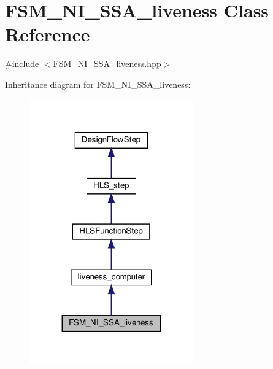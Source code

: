 \hypertarget{classFSM__NI__SSA__liveness}{}\section{F\+S\+M\+\_\+\+N\+I\+\_\+\+S\+S\+A\+\_\+liveness Class Reference}
\label{classFSM__NI__SSA__liveness}


{\ttfamily \#include $<$F\+S\+M\+\_\+\+N\+I\+\_\+\+S\+S\+A\+\_\+liveness.\+hpp$>$}



Inheritance diagram for F\+S\+M\+\_\+\+N\+I\+\_\+\+S\+S\+A\+\_\+liveness\+:
\nopagebreak
\begin{figure}[H]
\begin{center}
\leavevmode
\includegraphics[width=200pt]{d4/d93/classFSM__NI__SSA__liveness__inherit__graph}
\end{center}
\end{figure}



